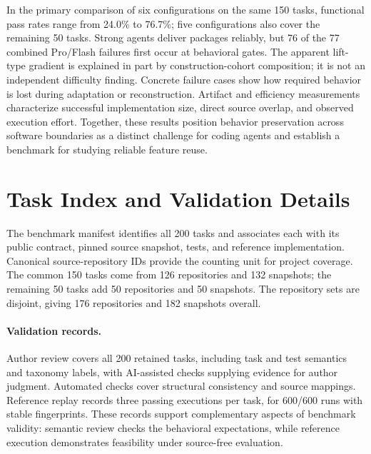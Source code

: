 \documentclass[acmsmall,screen,review,anonymous,nonacm]{acmart}
\begin{document}
In the primary comparison of six configurations on the same 150 tasks,
functional pass rates range from 24.0\% to 76.7\%; five configurations also
cover the remaining 50 tasks. Strong agents deliver packages reliably, but
76 of the 77 combined Pro/Flash failures first occur at behavioral gates.
The apparent lift-type gradient is explained in part by construction-cohort
composition; it is not an independent difficulty finding. Concrete failure
cases show how required behavior is lost during adaptation or reconstruction.
Artifact and efficiency measurements characterize successful implementation
size, direct source overlap, and observed execution effort. Together, these results position
behavior preservation across software boundaries as a distinct challenge for
coding agents and establish a benchmark for studying reliable feature reuse.

\FloatBarrier


\FloatBarrier
\appendix

\section{Task Index and Validation Details}
\label{app:provenance}
The benchmark manifest identifies all 200 tasks and associates each with its
public contract, pinned source snapshot, tests, and reference implementation.
Canonical source-repository IDs provide the counting unit for project coverage.
The common 150 tasks come from 126 repositories and 132 snapshots; the remaining
50 tasks add 50 repositories and 50 snapshots. The repository sets are disjoint,
giving 176 repositories and 182 snapshots overall.

\paragraph{Validation records.}
Author review covers all 200 retained tasks, including task and test semantics
and taxonomy labels, with AI-assisted checks supplying evidence for author
judgment. Automated checks cover structural consistency and source mappings.
Reference replay records three passing executions per task, for 600/600 runs
with stable fingerprints. These records support complementary aspects of
benchmark validity: semantic review checks the behavioral expectations, while
reference execution demonstrates feasibility under source-free evaluation.
\end{document}
